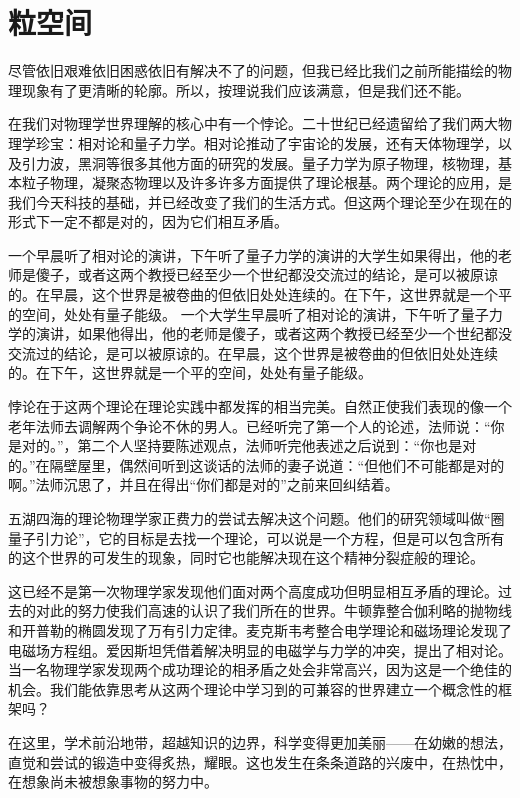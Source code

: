 	\chapter{粒空间}
\indent

   尽管依旧艰难依旧困惑依旧有解决不了的问题，但我已经比我们之前所能描绘的物理现象有了更清晰的轮廓。所以，按理说我们应该满意，但是我们还不能。

   在我们对物理学世界理解的核心中有一个悖论。二十世纪已经遗留给了我们两大物理学珍宝：相对论和量子力学。相对论推动了宇宙论的发展，还有天体物理学，以及引力波，黑洞等很多其他方面的研究的发展。量子力学为原子物理，核物理，基本粒子物理，凝聚态物理以及许多许多方面提供了理论根基。两个理论的应用，是我们今天科技的基础，并已经改变了我们的生活方式。但这两个理论至少在现在的形式下一定不都是对的，因为它们相互矛盾。

   一个早晨听了相对论的演讲，下午听了量子力学的演讲的大学生如果得出，他的老师是傻子，或者这两个教授已经至少一个世纪都没交流过的结论，是可以被原谅的。在早晨，这个世界是被卷曲的但依旧处处连续的。在下午，这世界就是一个平的空间，处处有量子能级。
   一个大学生早晨听了相对论的演讲，下午听了量子力学的演讲，如果他得出，他的老师是傻子，或者这两个教授已经至少一个世纪都没交流过的结论，是可以被原谅的。在早晨，这个世界是被卷曲的但依旧处处连续的。在下午，这世界就是一个平的空间，处处有量子能级。

   悖论在于这两个理论在理论实践中都发挥的相当完美。自然正使我们表现的像一个老年法师去调解两个争论不休的男人。已经听完了第一个人的论述，法师说：“你是对的。”，第二个人坚持要陈述观点，法师听完他表述之后说到：“你也是对的。”在隔壁屋里，偶然间听到这谈话的法师的妻子说道：“但他们不可能都是对的啊。”法师沉思了，并且在得出“你们都是对的”之前来回纠结着。

   五湖四海的理论物理学家正费力的尝试去解决这个问题。他们的研究领域叫做“圈量子引力论”，它的目标是去找一个理论，可以说是一个方程，但是可以包含所有的这个世界的可发生的现象，同时它也能解决现在这个精神分裂症般的理论。

   这已经不是第一次物理学家发现他们面对两个高度成功但明显相互矛盾的理论。过去的对此的努力使我们高速的认识了我们所在的世界。牛顿靠整合伽利略的抛物线和开普勒的椭圆发现了万有引力定律。麦克斯韦考整合电学理论和磁场理论发现了电磁场方程组。爱因斯坦凭借着解决明显的电磁学与力学的冲突，提出了相对论。当一名物理学家发现两个成功理论的相矛盾之处会非常高兴，因为这是一个绝佳的机会。我们能依靠思考从这两个理论中学习到的可兼容的世界建立一个概念性的框架吗？

   在这里，学术前沿地带，超越知识的边界，科学变得更加美丽——在幼嫩的想法，直觉和尝试的锻造中变得炙热，耀眼。这也发生在条条道路的兴废中，在热忱中，在想象尚未被想象事物的努力中。

